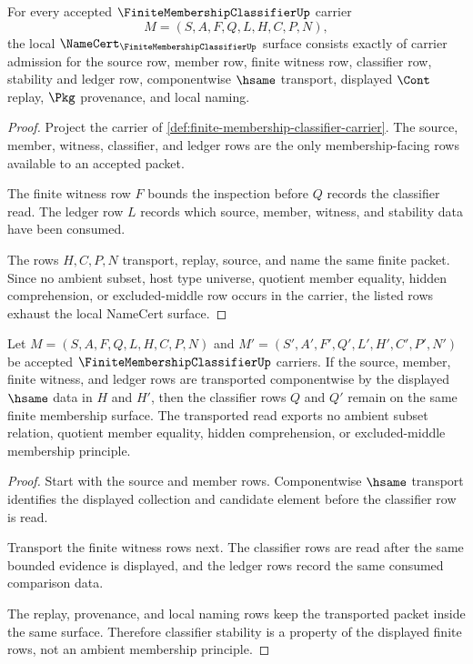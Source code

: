 \begin{theorem}
\label{thm:finite-membership-classifier-namecert-obligations}
For every accepted $\FiniteMembershipClassifierUp$ carrier
$$
M=(S,A,F,Q,L,H,C,P,N),
$$
the local $\NameCert_{\FiniteMembershipClassifierUp}$ surface consists exactly of carrier admission for the source row, member row, finite witness row, classifier row, stability and ledger row, componentwise $\hsame$ transport, displayed $\Cont$ replay, $\Pkg$ provenance, and local naming.
\end{theorem}
\begin{proof}
Project the carrier of \autoref{def:finite-membership-classifier-carrier}. The source, member, witness, classifier, and ledger rows are the only membership-facing rows available to an accepted packet.

The finite witness row $F$ bounds the inspection before $Q$ records the classifier read. The ledger row $L$ records which source, member, witness, and stability data have been consumed.

The rows $H,C,P,N$ transport, replay, source, and name the same finite packet. Since no ambient subset, host type universe, quotient member equality, hidden comprehension, or excluded-middle row occurs in the carrier, the listed rows exhaust the local NameCert surface.
\end{proof}

\begin{theorem}
\label{thm:finite-membership-classifier-stability}
Let $M=(S,A,F,Q,L,H,C,P,N)$ and $M'=(S',A',F',Q',L',H',C',P',N')$ be accepted $\FiniteMembershipClassifierUp$ carriers. If the source, member, finite witness, and ledger rows are transported componentwise by the displayed $\hsame$ data in $H$ and $H'$, then the classifier rows $Q$ and $Q'$ remain on the same finite membership surface. The transported read exports no ambient subset relation, quotient member equality, hidden comprehension, or excluded-middle membership principle.
\end{theorem}
\begin{proof}
Start with the source and member rows. Componentwise $\hsame$ transport identifies the displayed collection and candidate element before the classifier row is read.

Transport the finite witness rows next. The classifier rows are read after the same bounded evidence is displayed, and the ledger rows record the same consumed comparison data.

The replay, provenance, and local naming rows keep the transported packet inside the same surface. Therefore classifier stability is a property of the displayed finite rows, not an ambient membership principle.
\end{proof}

